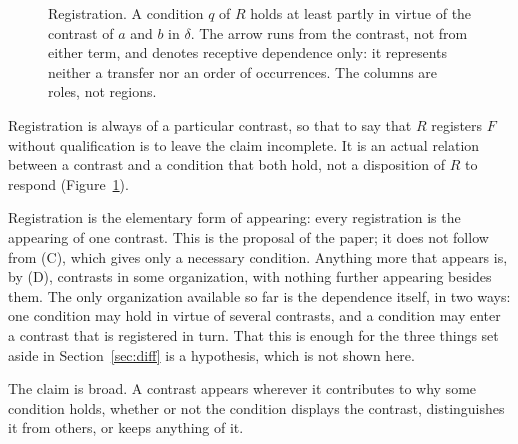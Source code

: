 \documentclass[11pt,a4paper,oneside]{scrartcl}
\newcommand{\F}{\ensuremath{F}}
\newcommand{\R}{\ensuremath{R}}
\begin{document}
\begin{figure}[tp]
  \centering\small
  \caption{Registration. A condition $q$ of \R{} holds at least partly in virtue of the contrast of
    $a$ and $b$ in $\delta$. The arrow runs from the contrast, not from either term, and denotes
    receptive dependence only: it represents neither a transfer nor an order of occurrences. The
    columns are roles, not regions.}
  \label{fig:registration}
\end{figure}

Registration is always of a particular contrast, so that to say that \R{} registers \F{} without
qualification is to leave the claim incomplete. It is an actual relation between a contrast and a
condition that both hold, not a disposition of \R{} to respond (Figure~\ref{fig:registration}).

Registration is the elementary form of appearing: every registration is the appearing of one
contrast. This is the proposal of the paper; it does not follow from (C), which gives only a
necessary condition. Anything more that appears is, by (D), contrasts in some organization, with
nothing further appearing besides them. The only organization available so far is the dependence
itself, in two ways: one condition may hold in virtue of several contrasts, and a
condition may enter a contrast that is registered in turn. That this is enough for the three things
set aside in Section~\ref{sec:diff} is a hypothesis, which is not shown here.

The claim is broad. A contrast appears wherever it contributes to why some
condition holds, whether or not the condition displays the contrast, distinguishes it from others,
or keeps anything of it.
\end{document}
